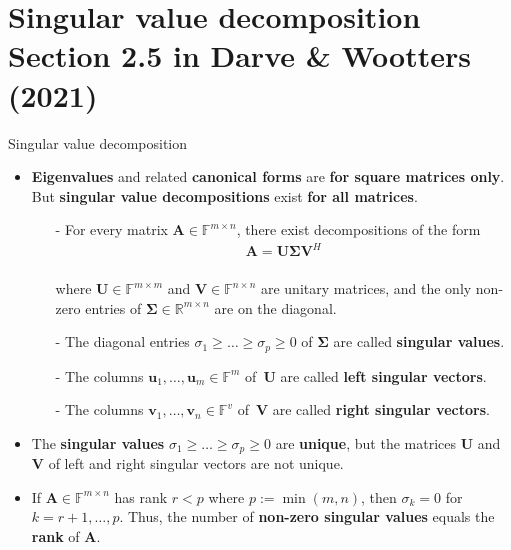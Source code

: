 \documentclass[t,usepdftitle=false]{beamer}
\begin{document}
\section{Singular value decomposition\\{\small Section 2.5 in Darve \& Wootters (2021)}}

\begin{frame}{Singular value decomposition}
\begin{itemize}
\item \textbf{Eigenvalues} and related \textbf{canonical forms} are \textbf{for square matrices only}.\vspace{.06cm}\\
But \textbf{singular value decompositions} exist \textbf{for all matrices}.
\begin{theorem}
\begin{itemize}
\item[-] For every matrix $\mathbf{A}\in\mathbb{F}^{m\times n}$, there exist decompositions of the form\vspace{-.2cm}
\begin{align*}
\mathbf{A}=\mathbf{U}\boldsymbol{\Sigma}\mathbf{V}^H
\end{align*}
\vspace{-.7cm}\\
where $\mathbf{U}\in\mathbb{F}^{m\times m}$ and $\mathbf{V}\in\mathbb{F}^{n\times n}$ are unitary matrices, and the only non-zero entries of $\boldsymbol{\Sigma}\in\mathbb{R}^{m\times n}$ are on the diagonal.\vspace{-.12cm}
\item[-] The diagonal entries $\sigma_1\geq\dots\geq\sigma_p\geq 0$ of $\boldsymbol{\Sigma}$ are called \textbf{singular values}.\vspace{-.12cm}
\item[-] The columns $\mathbf{u}_1,\dots,\mathbf{u}_m\in\mathbb{F}^m$ of $\,\mathbf{U}$ are called \textbf{left singular vectors}.\vspace{-.12cm}
\item[-] The columns $\mathbf{v}_1,\dots,\mathbf{v}_n\in\mathbb{F}^v$ of $\,\mathbf{V}$ are called \textbf{right singular vectors}.
\end{itemize}
\end{theorem}
\item The \textbf{singular values} $\sigma_1\geq\dots\geq\sigma_p\geq 0$ are \textbf{unique}, 
but the matrices $\mathbf{U}$ and $\mathbf{V}$ of left and right singular vectors are not unique.
\item If $\mathbf{A}\in\mathbb{F}^{m\times n}$ has rank $r<p$ where $p:=\min(m,n)$, then $\sigma_{k}=0$ for $k=r+1,\dots,p$. 
Thus, the number of \textbf{non-zero singular values} equals the \textbf{rank} of $\mathbf{A}$. 
\end{itemize}
\end{frame}
\end{document}
